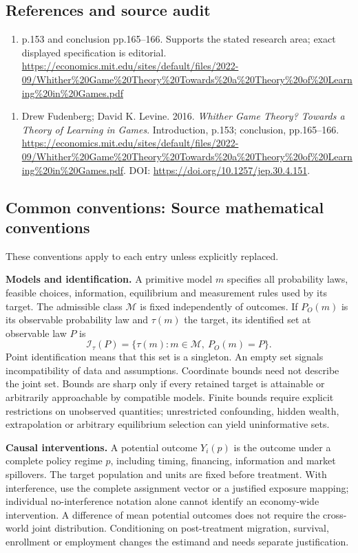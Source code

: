 \documentclass[11pt,a4paper]{article}
\begin{document}
\subsection*{References and source audit}
\begin{enumerate}
\item p.153 and conclusion pp.165–166. Supports the stated research area; exact displayed specification is editorial. \url{https://economics.mit.edu/sites/default/files/2022-09/Whither%20Game%20Theory%20Towards%20a%20Theory%20of%20Learning%20in%20Games.pdf}
\end{enumerate}
\begin{enumerate}\raggedright
\item\hypertarget{definitions:source:30007562:1}{} Drew Fudenberg; David K. Levine. 2016. \emph{Whither Game Theory? Towards a Theory of Learning in Games}. Introduction, p.153; conclusion, pp.165–166.
\url{https://economics.mit.edu/sites/default/files/2022-09/Whither%20Game%20Theory%20Towards%20a%20Theory%20of%20Learning%20in%20Games.pdf}.
DOI: \url{https://doi.org/10.1257/jep.30.4.151}.
\end{enumerate}

\subsection*{Common conventions: Source mathematical conventions}

These conventions apply to each entry unless explicitly replaced.

\textbf{Models and identification.} A primitive model \(m\) specifies all probability laws, feasible choices, information, equilibrium and measurement rules used by its target. The admissible class \(\mathcal M\) is fixed independently of outcomes. If \(P_O(m)\) is its observable probability law and \(\tau(m)\) the target, its identified set at observable law \(P\) is
\[
 \mathcal I_\tau(P)=\{\tau(m):m\in\mathcal M,\ P_O(m)=P\}.
\]
Point identification means that this set is a singleton. An empty set signals incompatibility of data and assumptions. Coordinate bounds need not describe the joint set. Bounds are sharp only if every retained target is attainable or arbitrarily approachable by compatible models. Finite bounds require explicit restrictions on unobserved quantities; unrestricted confounding, hidden wealth, extrapolation or arbitrary equilibrium selection can yield uninformative sets.

\textbf{Causal interventions.} A potential outcome \(Y_i(p)\) is the outcome under a complete policy regime \(p\), including timing, financing, information and market spillovers. The target population and units are fixed before treatment. With interference, use the complete assignment vector or a justified exposure mapping; individual no-interference notation alone cannot identify an economy-wide intervention. A difference of mean potential outcomes does not require the cross-world joint distribution. Conditioning on post-treatment migration, survival, enrollment or employment changes the estimand and needs separate justification.
\end{document}
